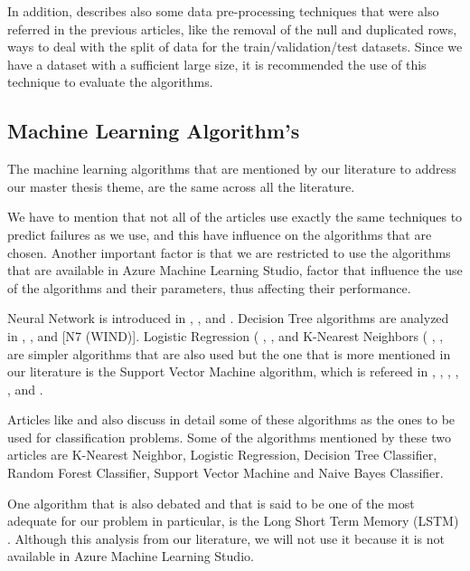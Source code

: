 In addition, \cite{MED_1} describes also some data pre-processing techniques that were also referred in the previous articles, like the removal of the null and duplicated rows, ways to deal with the split of data for the train/validation/test datasets.
Since we have a dataset with a sufficient large size, it is recommended the use of this technique to evaluate the algorithms.



\subsection{Machine Learning Algorithm's}

The machine learning algorithms that are mentioned by our literature to address our master thesis theme, are the same across all the literature.

We have to mention that not all of the articles use exactly the same techniques to predict failures as we use, and this have influence on the algorithms that are chosen. Another important factor is that we are restricted to use the algorithms that are available in Azure Machine Learning Studio, factor that influence the use of the algorithms and their parameters, thus affecting their performance.

Neural Network is introduced in \cite{OLD_15_WIND}, \cite{OLD_20_WIND}, \cite{OLD_41_WIND} and \cite{N_8_WIND}. Decision Tree algorithms are analyzed in \cite{OLD_41_WIND}, \cite{39_WIND}, \cite{N_3_WIND} and [N7 (WIND)]. Logistic Regression ( \cite{N_5_WIND}, \cite{N_7_GENERAL}, \cite{N_8_WIND} and K-Nearest Neighbors ( \cite{39_WIND}, \cite{N_3_WIND}, \cite{N_4_WIND} are simpler algorithms that are also used but the one that is more mentioned in our literature is the Support Vector Machine algorithm, which is refereed in \cite{OLD_41_WIND}, \cite{OLD_19_WIND}, \cite{39_WIND}, \cite{N_1_WIND}, \cite{N_2_WIND}, \cite{N_3_WIND} and \cite{N_8_WIND}.

Articles like \cite{ML_Alg_Analysis_2} and \cite{ML_Alg_Analysis} also discuss in detail some of these algorithms as the ones to be used for classification problems. Some of the algorithms mentioned by these two articles are K-Nearest Neighbor, Logistic Regression, Decision Tree Classifier, Random Forest Classifier, Support Vector Machine and Naive Bayes Classifier.

One algorithm that is also debated and that is said to be one of the most adequate for our problem in particular, is the Long Short Term Memory (LSTM) \cite{TDC_1}. Although this analysis from our literature, we will not use it because it is not available in Azure Machine Learning Studio.


